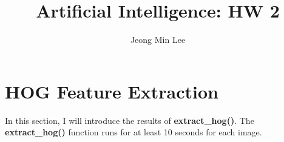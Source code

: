 \documentclass[10pt]{article}
\title{\textbf{Artificial Intelligence: HW 2}}
\author{Jeong Min Lee}
\begin{document}
\maketitle

\section{HOG Feature Extraction}

In this section, I will introduce the results of \textbf{extract\_hog()}. The \textbf{extract\_hog()} function runs for at least 10 seconds for each image.

\begin{figure}[!h]
    \centering
\end{figure}
\end{document}
